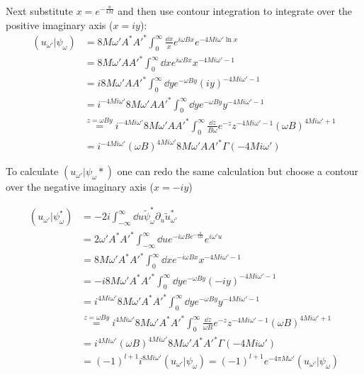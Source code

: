 Next substitute \(x = e^{-\frac{u}{4M}}\) and then use contour integration to integrate over the positive imaginary axis (\(x = i y\)):
\begin{align}
(u_{\omega'}|\psi_\omega) &= 8M \omega' A^*A'^* \int_{0}^\infty \frac{\dd{x}}{x} e^{i\omega B x} e^{-4M i \omega' \ln x}\\
&= 8M \omega' AA'^* \int_{0}^\infty \dd{x} e^{i\omega B x} x^{-4M i \omega' - 1}\\
&= i 8M \omega' AA'^* \int_{0}^\infty \dd{y} e^{-\omega B y} (iy)^{-4M i \omega' - 1}\\
&= i^{-4M i \omega'} 8M \omega' AA'^* \int_{0}^\infty \dd{y} e^{-\omega B y} y^{-4M i \omega' - 1}\\
&\overset{z = \omega B y}{=} i^{-4M i \omega'} 8M \omega' AA'^* \int_{0}^\infty \frac{\dd{z}}{B\omega} e^{-z} z^{-4M i \omega' - 1} (\omega B)^{4M i \omega' + 1}\\
&= i^{-4M i \omega'} (\omega B)^{4M i \omega'} 8M \omega' AA'^* \Gamma(-4M i \omega')
\label{equ:app_scalarproduct}
\end{align}

To calculate \((u_{\omega'}|\psi_\omega*)\) one can redo the same calculation but choose a contour over the negative imaginary axis (\(x = - iy\))

\begin{align}
(u_{\omega'}|\psi_\omega^*) &= -2i\int_{-\infty}^\infty \dd{u} \tilde{\psi}_\omega^* \partial_u \tilde{u}_{\omega'}^*\\
	&= 2\omega' A^*A'^* \int_{-\infty}^\infty \dd{u} e^{-i\omega B e^{-\frac{u}{4M}}} e^{i\omega' u}\\
	&= 8M \omega'A^*A'^* \int_{0}^\infty \dd{x} e^{-i\omega B x} x^{-4M i \omega' - 1}\\
	&= -i 8M \omega' A^*A'^* \int_{0}^\infty \dd{y} e^{-\omega B y} (-iy)^{-4M i \omega' - 1}\\
	&= i^{4M i \omega'} 8M \omega' A^*A'^* \int_{0}^\infty \dd{y} e^{-\omega B y} y^{-4M i \omega' - 1}\\
	&\overset{z = \omega B y}{=} i^{4M i \omega'} 8M \omega' A^*A'^* \int_{0}^\infty \frac{\dd{z}}{\omega B} e^{-z} z^{-4M i \omega' - 1} (\omega B)^{4M i \omega' + 1}\\
	&= i^{4M i \omega'} (\omega B)^{4M i \omega'}  8M \omega' A^*A'^* \Gamma(-4M i \omega')\\
	&= (-1)^{l+1} i^{8M i \omega'} (u_{\omega'}|\psi_\omega) = (-1)^{l+1} e^{-4\pi M \omega'} (u_{\omega'}|\psi_\omega) 
\end{align}

